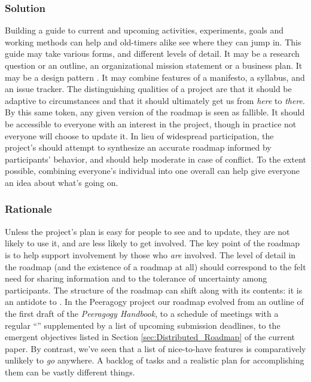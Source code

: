 \subsubsection*{Solution} Building a guide to current and upcoming activities, experiments, goals and working methods can help  and old-timers alike see where they can jump in.  This guide may take various forms, and different levels of detail.  It may be a research question or an outline, an organizational mission statement or a business plan.  It may be a design pattern \cite{kohls2010structure}. It may combine features of a manifesto, a syllabus, and an issue tracker.  The distinguishing qualities of a project  are that it should be adaptive to circumstances and that it should ultimately get us from \emph{here} to \emph{there}.  By this same token, any given version of the roadmap is seen as fallible.  It should be accessible to everyone with an interest in the project, though in practice not everyone will choose to update it.  In lieu of widespread participation, the project's  should attempt to synthesize an accurate roadmap informed by participants' behavior, and should help moderate in case of conflict.  To the extent possible, combining everyone's individual  into one overall  can help give everyone an idea about what's going on.

\subsubsection*{Rationale} Unless the project's plan is easy for people to see and to update, they are not likely to use it, and are less likely to get involved.  The key point of the roadmap is to help support involvement by those who \emph{are} involved.   The level of detail in the roadmap (and the existence of a roadmap at all) should correspond to the felt need for sharing information and to the tolerance of uncertainty among participants.
The structure of the roadmap can shift along with its contents: it is an antidote to  \cite[pp. 121--124]{david2001software}. 
In the Peeragogy project our roadmap evolved from an outline of the first draft of the
\emph{Peeragogy Handbook}, to a schedule of meetings with a regular
``'' supplemented by a list of upcoming submission deadlines, to the emergent objectives listed in Section \ref{sec:Distributed_Roadmap} of the current paper.
By contrast, we've seen that a list of nice-to-have features is comparatively
unlikely to \emph{go} anywhere.  A backlog of tasks and a realistic
plan for accomplishing them can be vastly different things.

